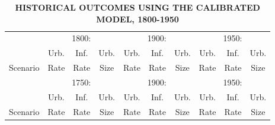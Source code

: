 \documentclass[10pt]{article}
\begin{document}
\begin{table}[htb]
\begin{center}
\begin{footnotesize}
\caption{\textbf{HISTORICAL OUTCOMES USING THE CALIBRATED MODEL, 1800-1950}} \label{tab_longrun}
\begin{tabular}{lccccccccc}
\midrule
         & \multicolumn{3}{c}{1800:} & \multicolumn{3}{c}{1900:} & \multicolumn{3}{c}{1950:} \\ \cmidrule(lr){2-4} \cmidrule(lr){5-7} \cmidrule(lr){8-10}
         & Urb. & Inf. & Urb. & Urb. & Inf. & Urb. & Urb. & Inf. & Urb. \\
Scenario & Rate & Rate & Size & Rate & Rate & Size & Rate & Rate & Size  \\ \midrule

\midrule
         & \multicolumn{3}{c}{1750:} & \multicolumn{3}{c}{1900:} & \multicolumn{3}{c}{1950:} \\ \cmidrule(lr){2-4} \cmidrule(lr){5-7} \cmidrule(lr){8-10}
         & Urb. & Inf. & Urb. & Urb. & Inf. & Urb. & Urb. & Inf. & Urb. \\
Scenario & Rate & Rate & Size & Rate & Rate & Size & Rate & Rate & Size  \\ \midrule

\midrule

\end{tabular}
\end{footnotesize}
\end{center}
\end{table}
\end{document}
